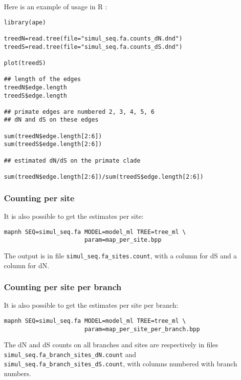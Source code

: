 \documentclass[11pt, a4paper]{article}
\begin{document}
{Here is an example of usage in R :

\begin{verbatim}
library(ape)

treedN=read.tree(file="simul_seq.fa.counts_dN.dnd")  
treedS=read.tree(file="simul_seq.fa.counts_dS.dnd")  

plot(treedS)

## length of the edges 
treedN$edge.length
treedS$edge.length

## primate edges are numbered 2, 3, 4, 5, 6
## dN and dS on these edges

sum(treedN$edge.length[2:6])
sum(treedS$edge.length[2:6])

## estimated dN/dS on the primate clade

sum(treedN$edge.length[2:6])/sum(treedS$edge.length[2:6])

\end{verbatim}


\subsubsection*{Counting per site}

It is also possible to get the estimates per site:

\begin{verbatim}
mapnh SEQ=simul_seq.fa MODEL=model_ml TREE=tree_ml \
                       param=map_per_site.bpp
\end{verbatim}


The output is in file \verb|simul_seq.fa_sites.count|, with a column
for dS and a column for dN.

\subsubsection*{Counting per site per branch}

It is also possible to get the estimates per site per branch:

\begin{verbatim}
mapnh SEQ=simul_seq.fa MODEL=model_ml TREE=tree_ml \
                       param=map_per_site_per_branch.bpp
\end{verbatim}

The dN and dS counts on all branches and sites are respectively in
files \verb|simul_seq.fa_branch_sites_dN.count| and\\
\verb|simul_seq.fa_branch_sites_dS.count|, with columns numbered
with branch numbers.


}
\end{document}
